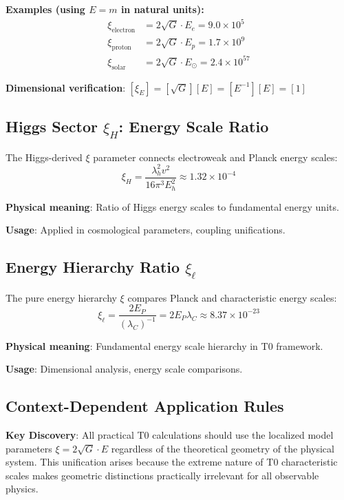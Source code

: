 \documentclass[12pt,a4paper]{article}
\begin{document}
\textbf{Examples (using $E = m$ in natural units):}
\begin{align}
	\xi_{\text{electron}} &= 2\sqrt{G} \cdot E_e = 9.0 \times 10^5 \\
	\xi_{\text{proton}} &= 2\sqrt{G} \cdot E_p = 1.7 \times 10^9 \\
	\xi_{\text{solar}} &= 2\sqrt{G} \cdot E_\odot = 2.4 \times 10^{57}
\end{align}

\textbf{Dimensional verification}: $[\xi_E] = [\sqrt{G}][E] = [E^{-1}][E] = [1]$ \checkmark

\subsection{Higgs Sector $\xi_H$: Energy Scale Ratio}
\label{subsec:xi_higgs}

The Higgs-derived $\xi$ parameter connects electroweak and Planck energy scales:
\begin{equation}
	\boxed{\xi_H = \frac{\lambda_h^2 v^2}{16\pi^3 E_h^2} \approx 1.32 \times 10^{-4}}
\end{equation}

\textbf{Physical meaning}: Ratio of Higgs energy scales to fundamental energy units.

\textbf{Usage}: Applied in cosmological parameters, coupling unifications.

\subsection{Energy Hierarchy Ratio $\xi_\ell$}
\label{subsec:xi_energy_hierarchy}

The pure energy hierarchy $\xi$ compares Planck and characteristic energy scales:
\begin{equation}
	\boxed{\xi_\ell = \frac{2E_P}{(\lambda_C)^{-1}} = 2E_P \lambda_C \approx 8.37 \times 10^{-23}}
\end{equation}

\textbf{Physical meaning}: Fundamental energy scale hierarchy in T0 framework.

\textbf{Usage}: Dimensional analysis, energy scale comparisons.

\subsection{Context-Dependent Application Rules}
\label{subsec:context_rules}

\begin{tcolorbox}[colback=orange!5!white,colframe=orange!75!black,title=Universal T0 Calculation Method]
	\textbf{Key Discovery}: All practical T0 calculations should use the localized model parameters $\xi = 2\sqrt{G} \cdot E$ regardless of the theoretical geometry of the physical system. This unification arises because the extreme nature of T0 characteristic scales makes geometric distinctions practically irrelevant for all observable physics.
\end{tcolorbox}
\end{document}
